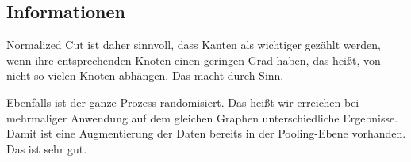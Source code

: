 \subsection{Informationen}

Normalized Cut ist daher sinnvoll, dass Kanten als wichtiger gezählt werden, wenn ihre entsprechenden Knoten einen geringen Grad haben, das heißt, von nicht so vielen Knoten abhängen.
Das macht durch Sinn.

Ebenfalls ist der ganze Prozess randomisiert.
Das heißt wir erreichen bei mehrmaliger Anwendung auf dem gleichen Graphen unterschiedliche Ergebnisse.
Damit ist eine Augmentierung der Daten bereits in der Pooling-Ebene vorhanden.
Das ist sehr gut.
